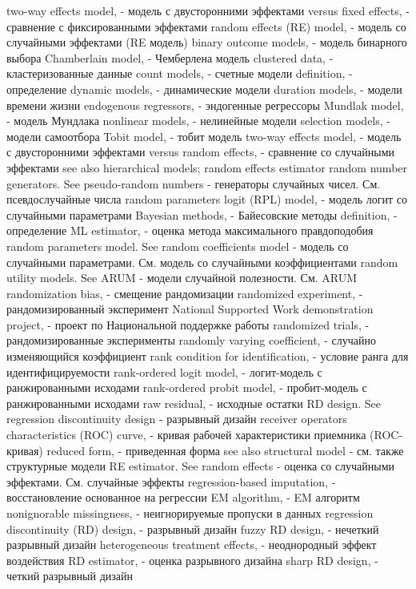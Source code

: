 two-way effects model, - модель с двусторонними эффектами
versus fixed effects, - сравнение с фиксированными эффектами
random effects (RE) model, - модель со случайными эффектами (RE модель)
binary outcome models, - модель бинарного выбора
Chamberlain model, - Чемберлена модель
clustered data, - кластеризованные данные
count models, - счетные модели
definition, - определение
dynamic models, - динамические модели
duration models, - модели времени жизни
endogenous regressors, - эндогенные регрессоры
Mundlak model, - модель Мундлака
nonlinear models, - нелинейные модели
selection models, - модели самоотбора
Tobit model, - тобит модель
two-way effects model, - модель с двусторонними эффектами
versus random effects, - сравнение со случайными эффектами
see also hierarchical models; random effects
estimator
random number generators. See pseudo-random numbers - генераторы случайных чисел. См. псевдослучайные числа
random parameters logit (RPL) model, - модель логит со случайными параметрами
Bayesian methods, - Байесовские методы
definition, - определение
ML estimator, - оценка метода максимального правдоподобия
random parameters model. See random coefficients model - модель со случайными параметрами. См. модель со случайными коэффициентами
random utility models. See ARUM - модели случайной полезности. См. ARUM
randomization bias, - смещение рандомизации
randomized experiment, - рандомизированный эксперимент
National Supported Work demonstration project, - проект по Национальной поддержке работы
randomized trials, - рандомизированные эксперименты
randomly varying coefficient, - случайно изменяющийся коэффициент
rank condition for identification, - условие ранга для идентифицируемости
rank-ordered logit model, - логит-модель с ранжированными исходами
rank-ordered probit model,  - пробит-модель с ранжированными исходами
raw residual, - исходные остатки
RD design. See regression discontinuity design - разрывный дизайн
receiver operators characteristics (ROC) curve, - кривая рабочей характеристики приемника (ROC-кривая)
reduced form, - приведенная форма
see also structural model - см. также структурные модели
RE estimator. See random effects - оценка со случайными эффектами. См. случайные эффекты
regression-based imputation, - восстановление основанное на регрессии
EM algorithm, - EM алгоритм
nonignorable missingness, - неигнорируемые пропуски в данных
regression discontinuity (RD) design, - разрывный дизайн
fuzzy RD design, - нечеткий разрывный дизайн
heterogeneous treatment effects, - неоднородный эффект воздействия
RD estimator, - оценка разрывного дизайна
sharp RD design, - четкий разрывный дизайн
